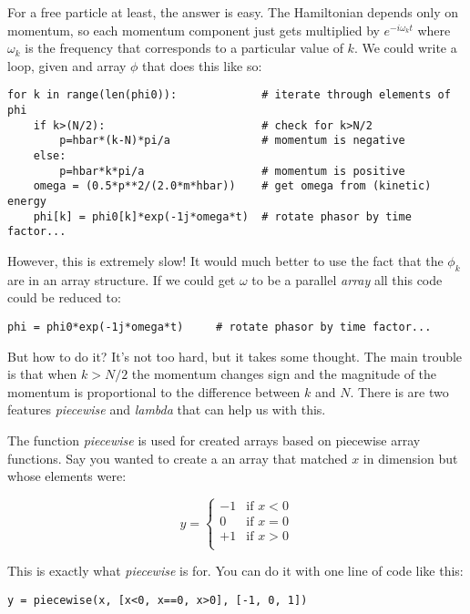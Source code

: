 \documentclass[11pt]{article} %
\begin{document}
For a free particle at least, the answer is easy. The Hamiltonian depends only on momentum, so each momentum component just gets multiplied by $e^{-i\omega_k t}$ where $\omega_k$ is the frequency that corresponds to a particular value of $k$. We could write a loop, given and array $\phi$ that does this like so:

\begin{verbatim}
for k in range(len(phi0)):             # iterate through elements of phi
    if k>(N/2):                        # check for k>N/2
        p=hbar*(k-N)*pi/a              # momentum is negative
    else:
        p=hbar*k*pi/a                  # momentum is positive
    omega = (0.5*p**2/(2.0*m*hbar))    # get omega from (kinetic) energy
    phi[k] = phi0[k]*exp(-1j*omega*t)  # rotate phasor by time factor...
\end{verbatim}

However, this is extremely slow! It would much better to use the fact that the $\phi_k$ are in an array structure. If we could get $\omega$ to be a parallel {\it array} all this code could be reduced to:

\begin{verbatim}
phi = phi0*exp(-1j*omega*t)     # rotate phasor by time factor...
\end{verbatim}

But how to do it? It's not too hard, but it takes some thought. The main trouble is that when $k>N/2$ the momentum changes sign and the magnitude of the momentum is proportional to the difference between $k$ and $N$. There is are two features {\it piecewise} and {\it lambda} that can help us with this. 

The function {\it piecewise} is used for created arrays based on piecewise array functions. Say you wanted to create a an array that matched $x$ in dimension but whose elements were:

\begin{equation}
y =
\begin{cases}
-1  & \text{if } x < 0\\
0  & \text{if } x = 0 \\
+1 & \text{if } x > 0\\
\end{cases}
\end{equation}

This is exactly what {\it piecewise} is for. You can do it with one line of code like this:

\begin{verbatim}
y = piecewise(x, [x<0, x==0, x>0], [-1, 0, 1])
\end{verbatim}
\end{document}
